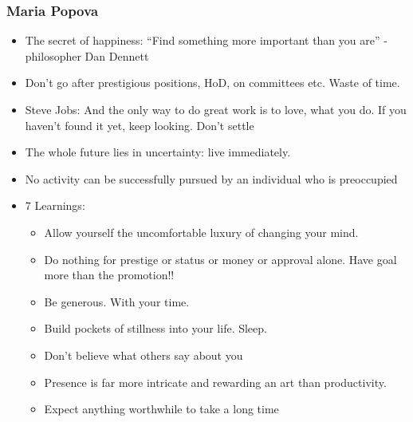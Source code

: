 \begin{frame}[fragile]\frametitle{Maria Popova}

	\begin{itemize}
	\item  The secret of happiness: ``Find something more important than you are'' - philosopher Dan Dennett
	\item Don't go after prestigious positions, HoD, on committees etc. Waste of time.
	\item Steve Jobs:  And the only way to do great work is to love, what you do. If you haven't found it yet, keep looking. Don't settle
	\item The whole future lies in uncertainty: live immediately.
	\item No activity can be successfully pursued by an individual who is preoccupied 
	\item 7 Learnings:
		\begin{itemize}
		\item Allow yourself the uncomfortable luxury of changing your mind.
		\item Do nothing for prestige or status or money or approval alone. Have goal more than the promotion!!
		\item Be generous. With your time.
		\item Build pockets of stillness into your life. Sleep.
		\item Don't believe what others say about you
		\item Presence is far more intricate and rewarding an art than productivity.
		\item Expect anything worthwhile to take a long time
		\end{itemize}
	\end{itemize}

\end{frame}